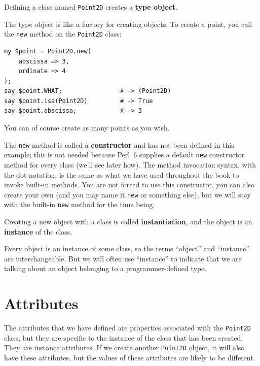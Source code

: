 Defining a class named {\tt Point2D} creates a {\bf type object}.

The type object is like a factory for creating objects.  To create 
a point, you call the {\tt new} method on the {\tt Point2D} class:

\begin{verbatim}
my $point = Point2D.new( 
    abscissa => 3, 
    ordinate => 4
);
say $point.WHAT;                # -> (Point2D)
say $point.isa(Point2D)         # -> True
say $point.abscissa;            # -> 3
\end{verbatim}
%
You can of course create as many points as you wish.

The {\tt new} method is called a {\bf constructor} and has not 
been defined in this example; this is not needed because 
Perl~6 supplies a default {\tt new} constructor method for 
every class (we'll see later how). The method invocation 
syntax, with the dot-notation, is the same as what we have 
used throughout the book to invoke built-in methods. You 
are not forced to use this constructor, you can also create 
your own (and you may name it {\tt new} or something else), 
but we will stay with the built-in {\tt new} method for the 
time being.

Creating a new object with a class is called {\bf instantiation}, 
and the object is an {\bf instance} of the class.

Every object is an instance of some class, so the terms 
``object'' and ``instance'' are interchangeable.  But 
we will often use ``instance'' to indicate that we are 
talking about an object belonging to a programmer-defined type.

\section{Attributes}
\label{attributes}

The attributes that we have defined are properties associated 
with the {\tt Point2D} class, but they are specific to the 
instance of the class that has been created. They are 
instance attributes. If we create another {\tt Point2D} object, 
it will also have these attributes, but the values of 
these attributes are likely to be different. 

